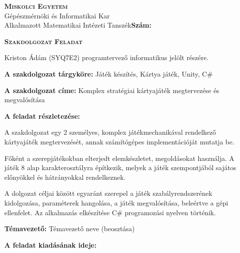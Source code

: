 \noindent
\textsc{\textbf{Miskolci Egyetem}}\\
Gépészmérnöki és Informatikai Kar\\
Alkalmazott Matematikai Intézeti Tanszék\hspace*{4cm}\hfil \textbf{Szám:}

\vspace{0.5cm}
\begin{center}
\large\textsc{\textbf{Szakdolgozat Feladat}}
\end{center}
\vspace{0.5cm}

Kriston Ádám (SYQ7E2) programtervező informatikus jelölt részére.

\bigskip
\noindent\textbf{A szakdolgozat tárgyköre:} Játék készítés, Kártya játék, Unity, C\#

\bigskip
\noindent\textbf{A szakdolgozat címe:} Komplex stratégiai kártyajáték megtervezése és megvalósítása

\bigskip
\noindent\textbf{A feladat részletezése:}

\medskip

A szakdolgozat egy 2 személyes, komplex játékmechanikával rendelkező kártyajáték megtervezését, annak számítógépes implementációját mutatja be.

Főként a szerepjátékokban elterjedt elemkészletet, megoldásokat használja. A játék 8 alap karakterosztályra építkezik, melyek a játék szempontjából sajátos előnyökkel és hátrányokkal rendelkeznek.

A dolgozat céljai között egyaránt szerepel a játék szabályrendszerének kidolgozása, paraméterek hangolása, a játék megvalósítása, beleértve a gépi ellenfelet. Az alkalmazás elkészítése C\# programozási nyelven történik.

\vfill

\noindent\textbf{Témavezető:} Témavezető neve (beosztása)


\bigskip
\noindent\textbf{A feladat kiadásának ideje:}


\vspace{1.5cm}

\hfill\makebox[6cm]{\dotfill}

\hfill{}

